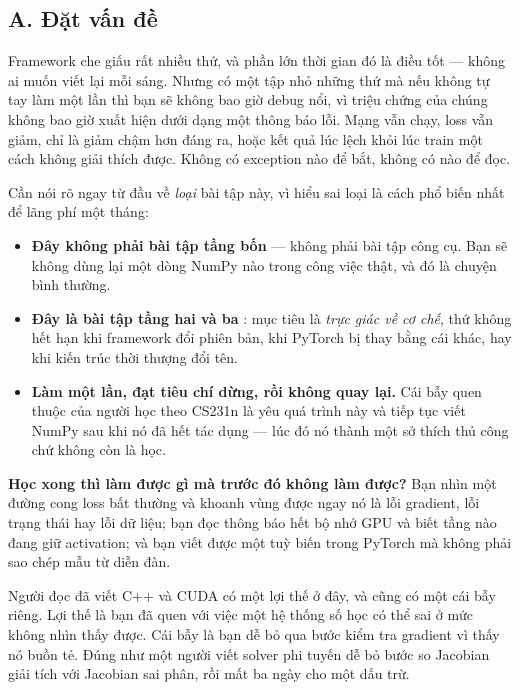 \documentclass[../../../deep_learning.tex]{subfiles}
\begin{document}
\subsection{A. Đặt vấn đề}
Framework che giấu rất nhiều thứ, và phần lớn thời gian đó là điều tốt --- không ai muốn viết lại  mỗi sáng. Nhưng có một tập nhỏ những thứ mà nếu không tự tay làm một lần thì bạn sẽ không bao giờ debug nổi, vì triệu chứng của chúng không bao giờ xuất hiện dưới dạng một thông báo lỗi. Mạng vẫn chạy, loss vẫn giảm, chỉ là giảm chậm hơn đáng ra, hoặc kết quả lúc  lệch khỏi lúc train một cách không giải thích được. Không có exception nào để bắt, không có  nào để đọc.

Cần nói rõ ngay từ đầu về \emph{loại} bài tập này, vì hiểu sai loại là cách phổ biến nhất để lãng phí một tháng:

\begin{itemize}
\item \textbf{Đây không phải bài tập tầng bốn} --- không phải bài tập công cụ. Bạn sẽ không dùng lại một dòng NumPy nào trong công việc thật, và đó là chuyện bình thường.
\item \textbf{Đây là bài tập tầng hai và ba} : mục tiêu là \emph{trực giác về cơ chế}, thứ không hết hạn khi framework đổi phiên bản, khi PyTorch bị thay bằng cái khác, hay khi kiến trúc thời thượng đổi tên.
\item \textbf{Làm một lần, đạt tiêu chí dừng, rồi không quay lại.} Cái bẫy quen thuộc của người học theo CS231n là yêu quá trình này và tiếp tục viết NumPy sau khi nó đã hết tác dụng --- lúc đó nó thành một sở thích thủ công chứ không còn là học.
\end{itemize}

\textbf{Học xong thì làm được gì mà trước đó không làm được?} Bạn nhìn một đường cong loss bất thường và khoanh vùng được ngay nó là lỗi gradient, lỗi trạng thái hay lỗi dữ liệu; bạn đọc thông báo hết bộ nhớ GPU và biết tầng nào đang giữ activation; và bạn viết được một  tuỳ biến trong PyTorch mà không phải sao chép mẫu từ diễn đàn.

Người đọc đã viết C++ và CUDA có một lợi thế ở đây, và cũng có một cái bẫy riêng. Lợi thế là bạn đã quen với việc một hệ thống số học có thể sai ở mức không nhìn thấy được. Cái bẫy là bạn dễ bỏ qua bước kiểm tra gradient vì thấy nó buồn tẻ. Đúng như một người viết solver phi tuyến dễ bỏ bước so Jacobian giải tích với Jacobian sai phân, rồi mất ba ngày cho một dấu trừ.
\end{document}
